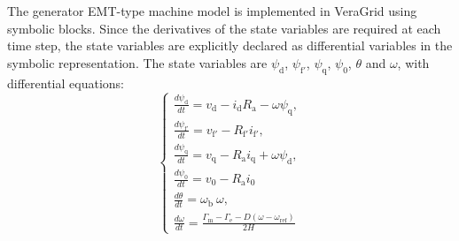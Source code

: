 The generator EMT-type machine model is implemented in VeraGrid using symbolic blocks. Since the derivatives of the 
state variables are required at each time step, the state variables are explicitly declared as differential variables 
in the symbolic representation. The state variables are $\psi_\text{d}$, $\psi_{\text{f}'}$, $\psi_\text{q}$, $\psi_\text{0}$, $\theta$ and $\omega$, 
with differential equations:
\begin{equation}
\begin{cases}
\displaystyle \frac{d \psi_\text{d}}{dt} = v_\text{d} - i_\text{d} R_\text{a} - \omega \psi_\text{q}, \\[6pt]
\displaystyle \frac{d \psi_{\text{f}'}}{dt} = v_{\text{f}'} - R_{\text{f}'} i_{\text{f}'}, \\[6pt]
\displaystyle \frac{d \psi_\text{q}}{dt} = v_\text{q} - R_\text{a} i_\text{q} + \omega \psi_\text{d}, \\[6pt]
\displaystyle \frac{d \psi_\text{0}}{dt} = v_\text{0} - R_\text{a} i_\text{0} \\[6pt]
\displaystyle \frac{d \theta}{dt} = \omega_\text{b}~\omega, \\[6pt]
\displaystyle \frac{d \omega}{dt} = \frac{\Gamma_\text{m} - \Gamma_\text{e} - D(\omega - \omega_{\text{ref}})}{2 H}
\end{cases}
\label{eq:diff_eq_gen}
\end{equation}


